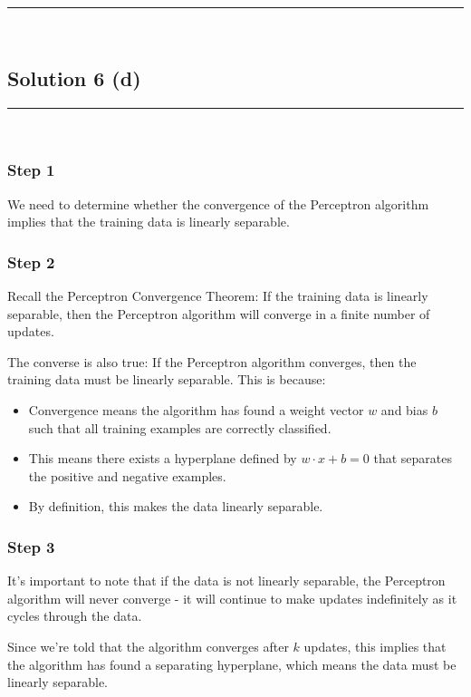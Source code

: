 \documentclass{article}
\begin{document}
\noindent\rule{\textwidth}{0.4pt}\\

\newpage

\subsection*{Solution 6 (d)}
\noindent\rule{\textwidth}{0.4pt}\\

\subsubsection*{Step 1}
\parbox{\textwidth}{
We need to determine whether the convergence of the Perceptron algorithm implies that the training data is linearly separable.
}

\subsubsection*{Step 2}
\parbox{\textwidth}{
Recall the Perceptron Convergence Theorem: If the training data is linearly separable, then the Perceptron algorithm will converge in a finite number of updates.

The converse is also true: If the Perceptron algorithm converges, then the training data must be linearly separable. This is because:

\begin{itemize}
    \item Convergence means the algorithm has found a weight vector $w$ and bias $b$ such that all training examples are correctly classified.
    \item This means there exists a hyperplane defined by $w \cdot x + b = 0$ that separates the positive and negative examples.
    \item By definition, this makes the data linearly separable.
\end{itemize}
}

\subsubsection*{Step 3}
\parbox{\textwidth}{
It's important to note that if the data is not linearly separable, the Perceptron algorithm will never converge - it will continue to make updates indefinitely as it cycles through the data.

Since we're told that the algorithm converges after $k$ updates, this implies that the algorithm has found a separating hyperplane, which means the data must be linearly separable.
}
\end{document}
